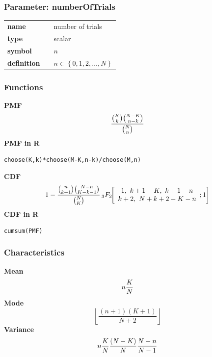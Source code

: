 \subsubsection*{Parameter: numberOfTrials}

\noindent\begin{tabular}{p{2cm}cl}
\textbf{name} & & number of trials \\
\textbf{type} & & scalar \\
\textbf{symbol} & & $n$  \\
\textbf{definition} & & $n \in \left\{0,1,2,\dots,N\right\}$
\end{tabular}
\subsubsection*{Functions}

\smallskip \noindent \hspace{.2cm} \textbf{PMF} 
\begin{equation*}{{{K \choose k} {{N-K} \choose {n-k}}}\over {N \choose n}}\end{equation*}
\smallskip \noindent \hspace{.2cm} \textbf{PMF in R}  
\begin{verbatim}choose(K,k)*choose(M-K,n-k)/choose(M,n)\end{verbatim}
\smallskip \noindent \hspace{.2cm} \textbf{CDF} 
\begin{equation*}1-{{{n \choose {k+1}}{{N-n} \choose {K-k-1}}}\over {N \choose K}} \,_3F_2\!\!\left[\begin{array}{c}1,\ k+1-K,\ k+1-n \\ k+2,\ N+k+2-K-n\end{array};1\right]\end{equation*}
\smallskip \noindent \hspace{.2cm} \textbf{CDF in R} 
\begin{verbatim}cumsum(PMF)\end{verbatim}
\smallskip
\subsubsection*{Characteristics}
\smallskip \noindent \hspace{.2cm} \textbf{Mean} 
\begin{equation*}n {K\over N}\end{equation*}
\smallskip \noindent \hspace{.2cm} \textbf{Mode} 
\begin{equation*}\left \lfloor \frac{(n+1)(K+1)}{N+2} \right \rfloor\end{equation*}
\smallskip \noindent \hspace{.2cm} \textbf{Variance} 
\begin{equation*}n{K\over N}{(N-K)\over N}{N-n\over N-1}\end{equation*}
\smallskip
